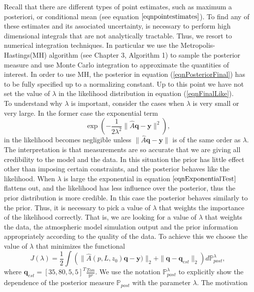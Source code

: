 \documentclass{sfuthesis}
\newcommand{\post}{\mathbb{P}_{post}}
\newcommand{\q}{\textbf{q}}
\newcommand{\y}{\textbf{y}}
\begin{document}
Recall that  there are different 
types of point estimates, such as maximum a posteriori,
or conditional mean (see equation $\eqref{eqnpointestimates}$). To find any of these estimates   and its associated uncertainty,  is necessary to perform  high
dimensional integrals that are not analytically tractable. Thus, we resort to  numerical integration techniques. In 
particular   we use
the Metropolis-Hastings(MH) algorithm (see Chapter 3, Algorithm 1) to sample  the posterior measure and 
use Monte Carlo integration to approximate the quantities of interest. In order to use MH, the posterior
in equation (\ref{eqnPosteriorFinal}) has to be fully specified up to a normalizing constant. Up to this point we have not
set the value of $\lambda$ in the likelihood distribution in equation (\ref{eqnFinalLike}).
\\ 
To understand why $\lambda$ is important, consider
the cases when $\lambda$ is very small or  very large. In the former case the exponential  term 
\begin{equation}\label{eqnExponentialTest}
\exp\left(-\frac{1}{2\lambda^{2}}\|\widehat{A}\q-\y\|^{2}\right),
\end{equation}
in the likelihood becomes negligible unless $\|\widehat{A}\q-\y\|$ is of the same order as $\lambda$. The interpretation
is that measurements are so accurate that we are giving all credibility to the model and the data. In this situation the prior
has little effect other than imposing certain constraints, and
the posterior behaves like the likelihood.
When $\lambda$ is large the exponential in equation $\eqref{eqnExponentialTest}$ flattens out, and 
the likelihood has less influence over the posterior,
thus  the prior distribution is more credible.
In this case the posterior behaves similarly to the prior. Thus, it is necessary to pick a value of 
$\lambda$ that weights the importance of the likelihood correctly. That is, we are looking for
a value of $\lambda$ that weights the data, the atmospheric model simulation output and
the prior information appropriately according to the quality of the data. To achieve this we choose the value of $\lambda$ that
 minimizes the functional
\begin{equation}\label{eqnFunctional2Optimize}
J(\lambda)=\frac{1}{2}\int\left(\|\widehat{A}(p,L,z_{0})\q-\y)\|_{2}+\|\q-\q_{est}\|_{2}\right)d\post^{\lambda},
\end{equation}
where $\q_{est}=[35,80,5,5]^{T}\frac{Ton}{yr}$. 
We use the notation $\post^{\lambda}$ to explicitly show the dependence of the posterior measure $\post$ with the parameter $\lambda$.  The motivation
\end{document}
